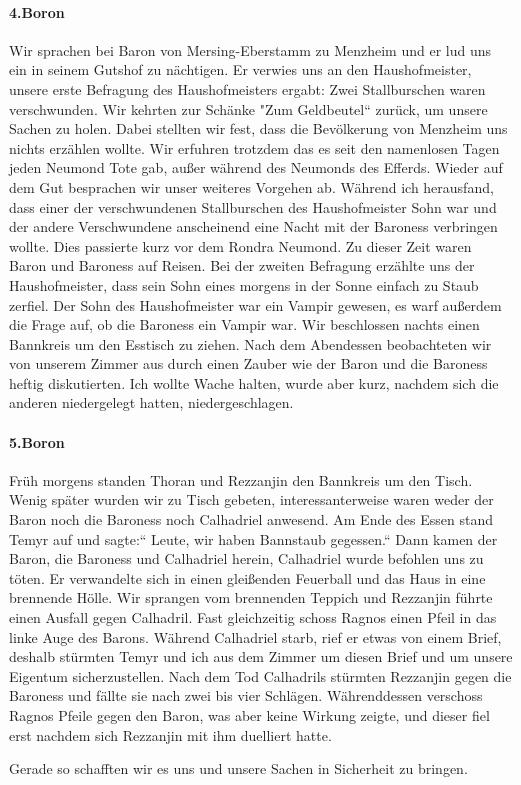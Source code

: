 \documentclass[11pt]{scrreprt}
\begin{document}
\paragraph{4.Boron}
Wir sprachen bei Baron von Mersing-Eberstamm zu Menzheim und er lud uns ein in seinem Gutshof zu nächtigen. Er verwies uns an den Haushofmeister, unsere erste Befragung des Haushofmeisters ergabt: Zwei Stallburschen waren verschwunden. Wir kehrten zur Schänke "Zum Geldbeutel“ zurück, um unsere Sachen zu holen. Dabei stellten wir fest, dass die Bevölkerung von Menzheim uns nichts erzählen wollte. Wir erfuhren trotzdem das es seit den namenlosen Tagen jeden Neumond Tote gab, außer während des Neumonds des Efferds. Wieder auf dem Gut besprachen wir unser weiteres Vorgehen ab.
Während ich herausfand, dass einer der verschwundenen Stallburschen des Haushofmeister Sohn war und der andere Verschwundene anscheinend eine Nacht mit der Baroness verbringen wollte. Dies passierte kurz vor dem Rondra Neumond. Zu dieser Zeit waren Baron und Baroness auf Reisen. Bei der zweiten Befragung erzählte uns der Haushofmeister, dass sein Sohn eines morgens in der Sonne einfach zu Staub zerfiel. Der Sohn des Haushofmeister war ein Vampir gewesen, es warf außerdem die Frage auf, ob die Baroness ein Vampir war. Wir beschlossen nachts einen Bannkreis um den Esstisch zu ziehen. Nach dem Abendessen beobachteten wir von unserem Zimmer aus durch einen Zauber wie der Baron und die Baroness heftig diskutierten. Ich wollte Wache halten, wurde aber kurz, nachdem sich die anderen niedergelegt hatten, niedergeschlagen.

\paragraph{5.Boron}
Früh morgens standen Thoran und Rezzanjin den Bannkreis um den Tisch. Wenig später wurden wir zu Tisch gebeten, interessanterweise waren weder der Baron noch die Baroness noch Calhadriel anwesend. Am Ende des Essen stand Temyr auf und sagte:“ Leute, wir haben Bannstaub gegessen.“ Dann kamen der Baron, die Baroness und Calhadriel herein, Calhadriel wurde befohlen uns zu töten. Er verwandelte sich in einen gleißenden Feuerball und das Haus in eine brennende Hölle.
Wir sprangen vom brennenden Teppich und Rezzanjin führte einen Ausfall gegen Calhadril. Fast gleichzeitig schoss Ragnos einen Pfeil in das linke Auge des Barons. Während Calhadriel starb, rief er etwas von einem Brief, deshalb stürmten Temyr und ich aus dem Zimmer um diesen Brief und um unsere Eigentum sicherzustellen. Nach dem Tod Calhadrils stürmten Rezzanjin gegen die Baroness und fällte sie nach zwei bis vier Schlägen. Währenddessen verschoss Ragnos Pfeile gegen den Baron, was aber keine Wirkung zeigte, und dieser fiel erst nachdem sich Rezzanjin mit ihm duelliert hatte.\par
Gerade so schafften wir es uns und unsere Sachen in Sicherheit zu bringen. 
\end{document}
